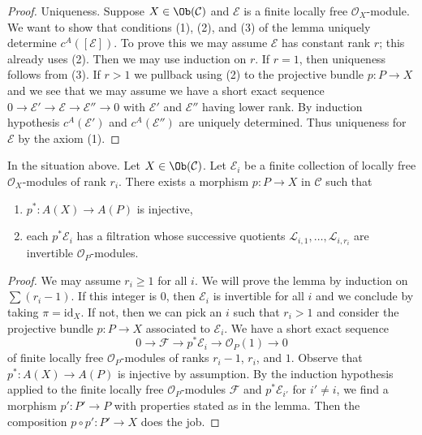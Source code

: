 \begin{proof}
\medskip\noindent
Uniqueness. Suppose $X \in \Ob(\mathcal{C})$ and $\mathcal{E}$
is a finite locally free $\mathcal{O}_X$-module. We want to show
that conditions (1), (2), and (3) of the lemma uniquely determine
$c^A([\mathcal{E}])$. To prove this we may assume $\mathcal{E}$
has constant rank $r$; this already uses (2). Then we may use induction on $r$.
If $r = 1$, then uniqueness follows from (3).
If $r > 1$ we pullback using (2) to the projective bundle $p : P \to X$
and we see that we may assume we have a short exact sequence
$0 \to \mathcal{E}' \to \mathcal{E} \to \mathcal{E}'' \to 0$
with $\mathcal{E}'$ and $\mathcal{E}''$ having lower rank.
By induction hypothesis $c^A(\mathcal{E}')$ and $c^A(\mathcal{E}'')$
are uniquely determined. Thus uniqueness for $\mathcal{E}$ by
the axiom (1).
\end{proof}

\begin{lemma}
\label{lemma-splitting-principle}
In the situation above. Let $X \in \Ob(\mathcal{C})$. Let $\mathcal{E}_i$
be a finite collection of locally free $\mathcal{O}_X$-modules of rank $r_i$.
There exists a morphism $p : P \to X$ in $\mathcal{C}$ such that
\begin{enumerate}
\item $p^* : A(X) \to A(P)$ is injective,
\item each $p^*\mathcal{E}_i$ has a filtration whose successive quotients
$\mathcal{L}_{i, 1}, \ldots, \mathcal{L}_{i, r_i}$
are invertible $\mathcal{O}_P$-modules.
\end{enumerate}
\end{lemma}

\begin{proof}
We may assume $r_i \geq 1$ for all $i$. We will prove the lemma by induction
on $\sum (r_i - 1)$. If this integer is $0$, then $\mathcal{E}_i$
is invertible for all $i$ and we conclude by taking $\pi = \text{id}_X$.
If not, then we can pick an $i$ such that $r_i > 1$ and consider the
projective bundle $p : P \to X$ associated to $\mathcal{E}_i$.
We have a short exact sequence
$$
0 \to \mathcal{F} \to p^*\mathcal{E}_i \to \mathcal{O}_P(1) \to 0
$$
of finite locally free $\mathcal{O}_P$-modules of ranks $r_i - 1$,
$r_i$, and $1$. Observe that $p^* : A(X) \to A(P)$ is injective
by assumption. By the induction hypothesis applied to the finite locally free
$\mathcal{O}_P$-modules $\mathcal{F}$ and $p^*\mathcal{E}_{i'}$
for $i' \not = i$, we find a morphism $p' : P' \to P$ with
properties stated as in the lemma. Then the composition
$p \circ p' : P' \to X$ does the job.
\end{proof}

